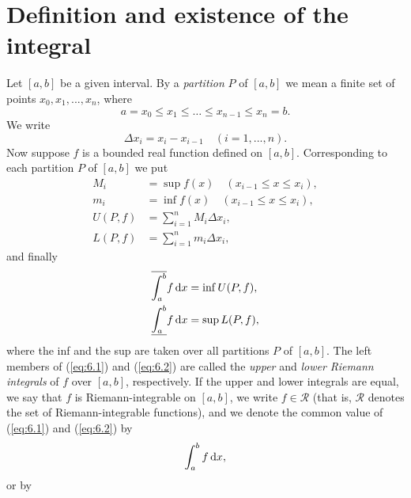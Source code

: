 \section{Definition and existence of the integral}
\begin{mydef}
    \label{def:6.1}
    Let $[a, b]$ be a given interval. 
    By a \emph{partition} $P$ of $[a, b]$ 
    we mean a finite set of points $x_0, x_1, ... , x_n$, where
    \begin{equation*}
        a = x_0 \leq x_1 \leq \dots \leq x_{n-1} \leq x_n = b.
    \end{equation*}
    We write
    \begin{equation*}
        \Delta x_i = x_i - x_{i-1}
        \quad    (i=1, ... ,n).
    \end{equation*}
    Now suppose $f$ is a bounded real function defined on $[a, b ]$. 
    Corresponding to each partition $P$ of $[a, b]$ we put
    \begin{align*}
        M_i &= \sup f(x) \quad (x_{i-1} \leq x \leq x_i), \\
        m_i &= \inf f(x) \quad (x_{i-1} \leq x \leq x_i), \\
        U(P,f) &= \sum_{i=1}^{n} M_i \Delta x_i,\\
        L(P,f) &= \sum_{i=1}^{n} m_i \Delta x_i,
    \end{align*}
    and finally
    \begin{align}
        \label{eq:6.1}
        \overline{\int_{a}^{b}} f \d x &= \inf U(P, f), \\
        \label{eq:6.2}
        \underline{\int_{a}^{b}} f \d x &= \sup L(P, f),
    \end{align}
    where the inf and the sup are taken over all partitions $P$ of $[a, b]$. 
    The left members of (\ref{eq:6.1}) and (\ref{eq:6.2}) are called 
    the \emph{upper} and \emph{lower Riemann integrals} of $f$
    over $[a, b]$, respectively.
    If the upper and lower integrals are equal, 
    we say that $f$ is Riemann-integrable on $[a, b]$, 
    we write $f \in \mathscr{R}$ 
    (that is, $\mathscr{R}$ denotes the set of Riemann-integrable functions), 
    and we denote the common value of (\ref{eq:6.1}) and (\ref{eq:6.2}) by
    \begin{equation}
        \label{eq:6.3}
        \int_{a}^{b} f \d x,
    \end{equation}
    or by 
    \begin{equation}
        \label{eq:6.4}

\end{equation}
\end{mydef}
